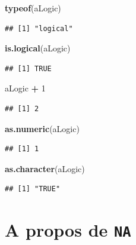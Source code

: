 \documentclass[
]{book}
\newenvironment{Shaded}{\begin{snugshade}}{\end{snugshade}}
\newcommand{\DecValTok}[1]{\textcolor[rgb]{0.00,0.00,0.81}{#1}}
\newcommand{\KeywordTok}[1]{\textcolor[rgb]{0.13,0.29,0.53}{\textbf{#1}}}
\newcommand{\NormalTok}[1]{#1}
\newcommand{\OperatorTok}[1]{\textcolor[rgb]{0.81,0.36,0.00}{\textbf{#1}}}
\newcommand{\StringTok}[1]{\textcolor[rgb]{0.31,0.60,0.02}{#1}}
\begin{document}
\begin{Shaded}
\begin{Highlighting}[]
\KeywordTok{typeof}\NormalTok{(aLogic)}
\end{Highlighting}
\end{Shaded}

\begin{verbatim}
## [1] "logical"
\end{verbatim}

\begin{Shaded}
\begin{Highlighting}[]
\KeywordTok{is.logical}\NormalTok{(aLogic)}
\end{Highlighting}
\end{Shaded}

\begin{verbatim}
## [1] TRUE
\end{verbatim}

\begin{Shaded}
\begin{Highlighting}[]
\NormalTok{aLogic }\OperatorTok{+}\StringTok{ }\DecValTok{1}
\end{Highlighting}
\end{Shaded}

\begin{verbatim}
## [1] 2
\end{verbatim}

\begin{Shaded}
\begin{Highlighting}[]
\KeywordTok{as.numeric}\NormalTok{(aLogic)}
\end{Highlighting}
\end{Shaded}

\begin{verbatim}
## [1] 1
\end{verbatim}

\begin{Shaded}
\begin{Highlighting}[]
\KeywordTok{as.character}\NormalTok{(aLogic)}
\end{Highlighting}
\end{Shaded}

\begin{verbatim}
## [1] "TRUE"
\end{verbatim}

\hypertarget{a-propos-de-na}{%
\section{\texorpdfstring{A propos de \texttt{NA}}{A propos de NA}}\label{a-propos-de-na}}
\end{document}

